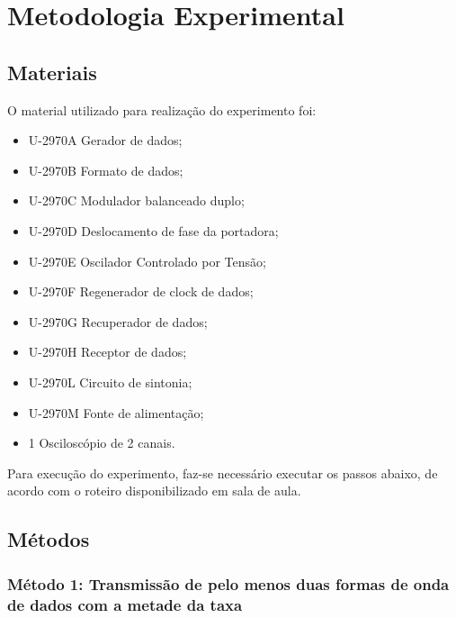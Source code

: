 \newpage
\section{Metodologia Experimental}

    \subsection{Materiais}
        O material utilizado para realização do experimento foi:

        \begin{itemize}
            \item U-2970A Gerador de dados;
            \item U-2970B Formato de dados;
            \item U-2970C Modulador balanceado duplo;
            \item U-2970D Deslocamento de fase da portadora;
            \item U-2970E Oscilador Controlado por Tensão;
            \item U-2970F Regenerador de clock de dados;
            \item U-2970G Recuperador de dados;
            \item U-2970H Receptor de dados;
            \item U-2970L Circuito de sintonia;
            \item U-2970M Fonte de alimentação;
            \item 1 Osciloscópio de 2 canais.
        \end{itemize}

        Para execução do experimento, faz-se necessário executar os passos abaixo, de acordo com o roteiro disponibilizado em sala de aula.

    \subsection{Métodos}
        \subsubsection{Método 1: Transmissão de pelo menos duas formas de onda de dados com a metade da taxa}
                      
